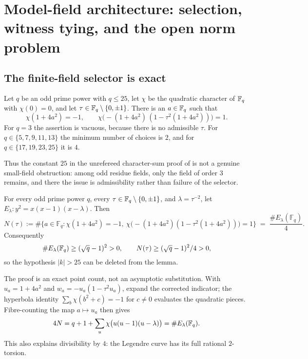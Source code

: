 \section{Model-field architecture: selection, witness tying, and the open norm problem}

\subsection{The finite-field selector is exact}

\begin{theorem}
Let $q$ be an odd prime power with $q\leq 25$, let $\chi$ be the quadratic
character of $\mathbb{F}_q$ with $\chi(0)=0$, and let
$\tau\in\mathbb{F}_q\setminus\{0,\pm1\}$.  There is an $a\in\mathbb{F}_q$ such that
\[
 \chi(1+4a^2)=-1,
 \qquad
 \chi\bigl(-(1+4a^2)\,(1-\tau^2(1+4a^2))\bigr)=1.
\]
For $q=3$ the assertion is vacuous, because there is no admissible $\tau$.
For $q\in\{5,7,9,11,13\}$ the minimum number of choices is $2$, and for
$q\in\{17,19,23,25\}$ it is $4$.
\end{theorem}

Thus the constant $25$ in the unrefereed character-sum proof of
\cite{sun} is not a genuine small-field obstruction: among odd residue
fields, only the field of order $3$ remains, and there the issue is
admissibility rather than failure of the selector.

\begin{theorem}
For every odd prime power $q$, every
$\tau\in\mathbb{F}_q\setminus\{0,\pm1\}$, and $\lambda=\tau^{-2}$, let
$E_\lambda:y^2=x(x-1)(x-\lambda)$.  Then
\[
N(\tau) := \#\bigl\{a \in \mathbb{F}_q : \chi(1+4a^2) = -1,\
\chi\bigl(-(1+4a^2)(1-\tau^2(1+4a^2))\bigr) = 1\bigr\} \;=\; \frac{\#E_\lambda(\mathbb{F}_q)}{4}.
\]
Consequently
\[
 \#E_\lambda(\mathbb{F}_q)\geq(\sqrt q-1)^2>0,
 \qquad N(\tau)\geq(\sqrt q-1)^2/4>0,
\]
so the hypothesis $|k|>25$ can be deleted from the lemma.
\end{theorem}

The proof is an exact point count, not an asymptotic substitution.  With
$u_a=1+4a^2$ and $w_a=-u_a(1-\tau^2u_a)$, expand the corrected indicator;
the hyperbola identity $\sum_b\chi(b^2+c)=-1$ for $c\neq0$ evaluates the
quadratic pieces.  Fibre-counting the map $a\mapsto u_a$ then gives
\[
4N=q+1+\sum_u\chi\bigl(u(u-1)(u-\lambda)\bigr)
   =\#E_\lambda(\mathbb{F}_q).
\]
This also explains divisibility by $4$: the Legendre curve has its full
rational $2$-torsion.

